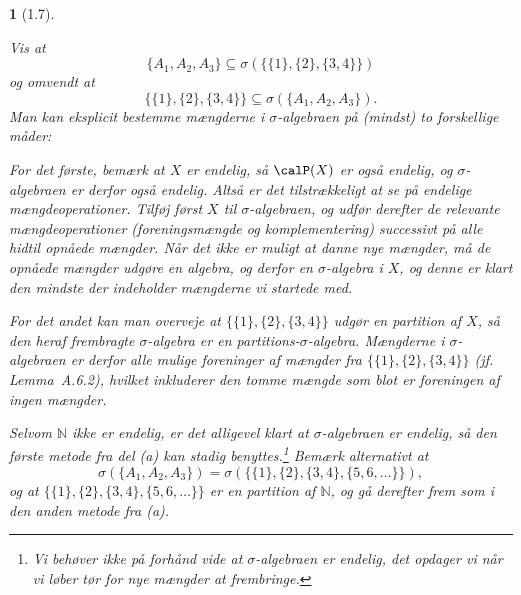 \documentclass[a4paper, 11pt, article, danish, oneside]{memoir}
\newcommand{\naturals}{\mathbb{N}}
\DeclarePairedDelimiter{\auxdelimparen}{(}{)}
\newcommand{\powerset}[2][]{\calP\auxdelimparen[#1]{#2}}
\newcommand{\pencilsymbol}{\raisebox{-2pt}{\normalfont\PencilLeft}}
\theoremstyle{changedotcustomnumber}
\theoremstyle{changedotbreakcustomnumber}
\newtheorem{opgavebreak}{\pencilsymbol}
\begin{document}
\begin{opgavebreak}[1.7]
\begin{solutionsec}
    \item Vis at
    \begin{equation*}
        \{A_1,A_2,A_3\} \subseteq \sigma(\{\{1\},\{2\},\{3,4\}\})
    \end{equation*}
    og omvendt at
    \begin{equation*}
        \{\{1\},\{2\},\{3,4\}\} \subseteq \sigma(\{A_1,A_2,A_3\}).
    \end{equation*}
    Man kan eksplicit bestemme mængderne i $\sigma$-algebraen på (mindst) to forskellige måder:

    For det første, bemærk at $X$ er endelig, så $\powerset{X}$ er også endelig, og $\sigma$-algebraen er derfor også endelig. Altså er det tilstrækkeligt at se på endelige mængdeoperationer. Tilføj først $X$ til $\sigma$-algebraen, og udfør derefter de relevante mængdeoperationer (foreningsmængde og komplementering) successivt på alle hidtil opnåede mængder. Når det ikke er muligt at danne nye mængder, må de opnåede mængder udgøre en algebra, og derfor en $\sigma$-algebra i $X$, og denne er klart den mindste der indeholder mængderne vi startede med.

    For det andet kan man overveje at $\{\{1\},\{2\},\{3,4\}\}$ udgør en partition af $X$, så den heraf frembragte $\sigma$-algebra er en partitions-$\sigma$-algebra. Mængderne i $\sigma$-algebraen er derfor alle mulige foreninger af mængder fra $\{\{1\},\{2\},\{3,4\}\}$ (jf. Lemma~A.6.2), hvilket inkluderer den tomme mængde som blot er foreningen af \emph{ingen} mængder.
    
    \item Selvom $\naturals$ ikke er endelig, er det alligevel klart at $\sigma$-algebraen er endelig, så den første metode fra del (a) kan stadig benyttes.\footnote{Vi behøver ikke på forhånd vide at $\sigma$-algebraen er endelig, det opdager vi når vi løber tør for nye mængder at frembringe.} Bemærk alternativt at
    \begin{equation*}
        \sigma(\{A_1,A_2,A_3\})
            = \sigma(\{\{1\},\{2\},\{3,4\},\{5,6,\ldots\}\}),
    \end{equation*}
    og at $\{\{1\},\{2\},\{3,4\},\{5,6,\ldots\}\}$ er en partition af $\naturals$, og gå derefter frem som i den anden metode fra (a).
\end{solutionsec}
\end{opgavebreak}
\end{document}
